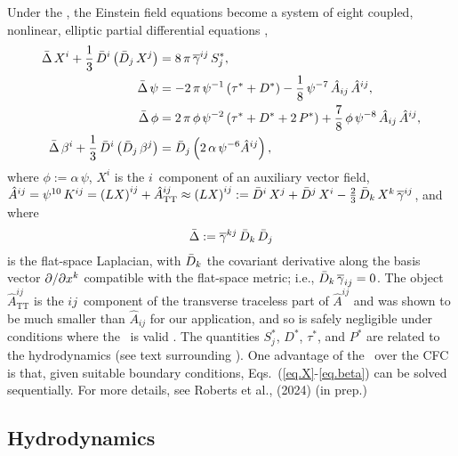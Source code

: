 Under the \xcfc, the Einstein field equations become a system of eight
coupled, nonlinear, elliptic partial differential equations \citep{ccd2009},
\begin{subequations}
  \begin{align}
    \bar{\Delta}\,X^{i}+\frac{1}{3}\,\bar{D}^{i}\left(\bar{D}_{j}\,X^{j}\right)
    &=8\,\pi\,\overline{\gamma}^{ij}\,S^{*}_{j},\label{eq.X}\\
    \bar{\Delta}\,\psi&=-2\,\pi\,\psi^{-1}\left(\tau^{*}+D^{*}\right)
    -\frac{1}{8}\,\psi^{-7}\,\hat{A}_{ij}\,\hat{A}^{ij},\label{eq.psi}\\
    \bar{\Delta}\,\phi&=2\,\pi\,\phi\,\psi^{-2}
    \left(\tau^{*}+D^{*}+2\,P^{*}\right)+\frac{7}{8}\,\phi\,\psi^{-8}\,
    \hat{A}_{ij}\,\hat{A}^{ij},
    \label{eq.alphaPsi}\\
    \bar{\Delta}\,\beta^{i}
    +\frac{1}{3}\,\bar{D}^{i}\left(\bar{D}_{j}\,\beta^{j}\right)&=
    \bar{D}_{j}\left(2\,\alpha\,\psi^{-6}\hat{A}^{ij}\right),\label{eq.beta}
  \end{align}
\end{subequations}
where $\phi:=\alpha\,\psi$,
$X^{i}$ is the $i$\myth\ component of an auxiliary vector field,
$\hat{A}^{ij}=\psi^{10}\,K^{ij}
=\left(LX\right)^{ij}+\hat{A}^{ij}_{\mathrm{TT}}\approx
\left(LX\right)^{ij}:=\bar{D}^{i}\,X^{j}+\bar{D}^{j}\,X^{i}
-\frac{2}{3}\,\bar{D}_{k}\,X^{k}\,\overline{\gamma}^{ij}$, and where
\begin{equation}
  \bar{\Delta}:=\overline{\gamma}^{kj}\,\bar{D}_{k}\,\bar{D}_{j}
\end{equation}
is the flat-space Laplacian, with $\bar{D}_{k}$ the covariant derivative
along the basis vector $\partial/\partial x^{k}$
compatible with the flat-space metric;
i.e., $\bar{D}_{k}\,\overline{\gamma}_{ij}=0$.
The object $\hat{A}^{ij}_{\mathrm{TT}}$ is the $ij$\myth\ component of the
transverse traceless part of $\hat{A}^{ij}$ and was shown to be much
smaller than $\hat{A}_{ij}$ for our application,
and so is safely negligible under conditions
where the \xcfc\ is valid \citep{ccd2009}.
The quantities $S^{*}_{j}$, $D^{*}$, $\tau^{*}$, and $P^{*}$ are related to the
hydrodynamics (see text surrounding ).
One advantage of the \xcfc\ over the CFC is that,
given suitable boundary conditions,
Eqs.~(\ref{eq.X}-\ref{eq.beta}) can be solved sequentially.
For more details, see Roberts et al., (2024) (in prep.)

\subsection{Hydrodynamics}
\label{ss.hydrodynamics}

